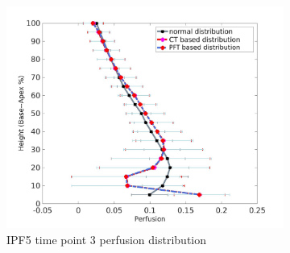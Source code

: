 \begin{figure}[htbp]
\begin{subfigure}{.6\linewidth}
  \includegraphics[width=\linewidth,trim={{.0\wd0} {.0\wd0} {.0\wd0} {.0\wd0}},clip]{Appendix/Image_AppexB/IPF513/IPF513_PerfusionAgainstLungHeight.png}
  \caption{IPF5 time point 3 perfusion distribution}
  \label{fig:VQDistribution-b}
\end{subfigure}
\begin{subfigure}{.6\linewidth}%

\end{subfigure}
\end{figure}
